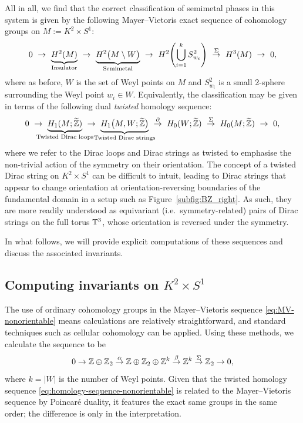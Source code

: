 All in all, we find that the correct classification of semimetal phases in this system is given by the following Mayer--Vietoris exact sequence of cohomology groups on $M := K^2\times S^1$:
\begin{equation}\label{eq:MV-nonorientable}
	0\ \to\ \underbrace{H^2(M)}_{\mathclap{\text{Insulator}}}\ \to\ \underbrace{H^2\big(M\setminus W\big)}_{\mathclap{\text{Semimetal}}}\ \to\ H^2\!\left(\bigcup_{i=1}^k S_{w_i}^2\right)\ \overset{\Sigma}{\to}\ H^3(M)\ \to\ 0,
\end{equation}
where as before, $W$ is the set of Weyl points on $M$ and $S_{w_i}^2$ is a small 2-sphere surrounding the Weyl point $w_i\in W$. Equivalently, the classification may be given in terms of the following dual \emph{twisted} homology sequence:
\begin{equation}\label{eq:homology-sequence-nonorientable}
	0\ \to\ \underbrace{H_1(M;\ext{\Z})}_{\mathclap{\text{Twisted Dirac loops}}}\ \to\ \underbrace{H_1\big(M, W;\ext{\Z}\big)}_{\mathclap{\text{Twisted Dirac strings}}}\ \overset{\partial}{\to}\ H_0(W;\ext{\Z})\ \overset{\Sigma}{\to}\ H_0(M;\ext{\Z})\ \to\ 0,
\end{equation}
where we refer to the Dirac loops and Dirac strings as twisted to emphasise the non-trivial action of the symmetry on their orientation. The concept of a twisted Dirac string on $K^2\times S^1$ can be difficult to intuit, leading to Dirac strings that appear to change orientation at orientation-reversing boundaries of the fundamental domain in a setup such as Figure~\ref{subfig:BZ_right}. As such, they are more readily understood as equivariant (i.e.\ symmetry-related) pairs of Dirac strings on the full torus $\mathbb{T}^3$, whose orientation is reversed under the symmetry.

In what follows, we will provide explicit computations of these sequences and discuss the associated invariants.


\subsection{Computing invariants on \texorpdfstring{$K^2\times S^1$}{K²×S¹}}

The use of ordinary cohomology groups in the Mayer--Vietoris sequence \eqref{eq:MV-nonorientable} means calculations are relatively straightforward, and standard techniques such as cellular cohomology can be applied.  Using these methods, we calculate the sequence to be
\begin{equation}\label{eq:explicit-sequence-nonorientable}
	0\to \mathbb{Z}\oplus\mathbb{Z}_2 \overset{\alpha}{\to} \mathbb{Z}\oplus\mathbb{Z}_2\oplus\mathbb{Z}^k \overset{\beta}{\to} \mathbb{Z}^k \overset{\Sigma}{\to} \mathbb{Z}_2 \to 0,
\end{equation}
where $k = |W|$ is the number of Weyl points. Given that the twisted homology sequence \eqref{eq:homology-sequence-nonorientable} is related to the Mayer--Vietoris sequence by Poincaré duality, it features the exact same groups in the same order; the difference is only in the interpretation. 

